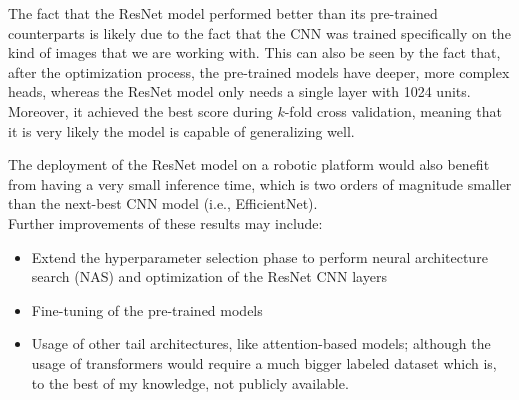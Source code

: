 \noindent
The fact that the ResNet model performed better than its pre-trained counterparts is likely due to the fact that the CNN was trained specifically on the kind of images that we are working with. This can also be seen by the fact that, after the optimization process, the pre-trained models have deeper, more complex heads, whereas the ResNet model only needs a single layer with 1024 units. Moreover, it achieved the best score during $k$-fold cross validation, meaning that it is very likely the model is capable of generalizing well.

The deployment of the ResNet model on a robotic platform would also benefit from having a very small inference time, which is two orders of magnitude smaller than the next-best CNN model (i.e., EfficientNet).\\

\noindent
Further improvements of these results may include:

\begin{itemize}
    \item Extend the hyperparameter selection phase to perform neural architecture search (NAS) and optimization of the ResNet CNN layers
    \item Fine-tuning of the pre-trained models
    \item Usage of other tail architectures, like attention-based models; although the usage of transformers would require a much bigger labeled dataset which is, to the best of my knowledge, not publicly available.  
\end{itemize}


